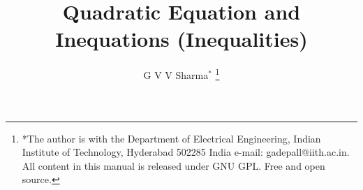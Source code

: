 \documentclass[journal,12pt,twocolumn]{IEEEtran}
\renewcommand\thesection{\arabic{section}}
\begin{document}
\let\StandardTheFigure\thefigure
\renewcommand{\thefigure}{\thesection}



\makeatletter
{}
\makeatother

\let\StandardTheFigure\thefigure
\let\StandardTheTable\thetable
\let\vec\mathbf





\def\putbox#1#2#3{\makebox[0in][l]{\makebox[#1][l]{}\raisebox{\baselineskip}[0in][0in]{\raisebox{#2}[0in][0in]{#3}}}}
     \def\rightbox#1{\makebox[0in][r]{#1}}
     \def\centbox#1{\makebox[0in]{#1}}
     \def\topbox#1{\raisebox{-\baselineskip}[0in][0in]{#1}}
     \def\midbox#1{\raisebox{-0.5\baselineskip}[0in][0in]{#1}}

\vspace{3cm}

\title{ 
Quadratic Equation and Inequations (Inequalities)
}

\author{ G V V Sharma$^{*}$%
	\thanks{*The author is with the Department
		of Electrical Engineering, Indian Institute of Technology, Hyderabad
		502285 India e-mail:  gadepall@iith.ac.in. All content in this manual is released under GNU GPL.  Free and open source.}
	
}	

\maketitle


\bigskip

\renewcommand{\thefigure}{\theenumi}
\renewcommand{\thetable}{\theenumi}
\end{document}

